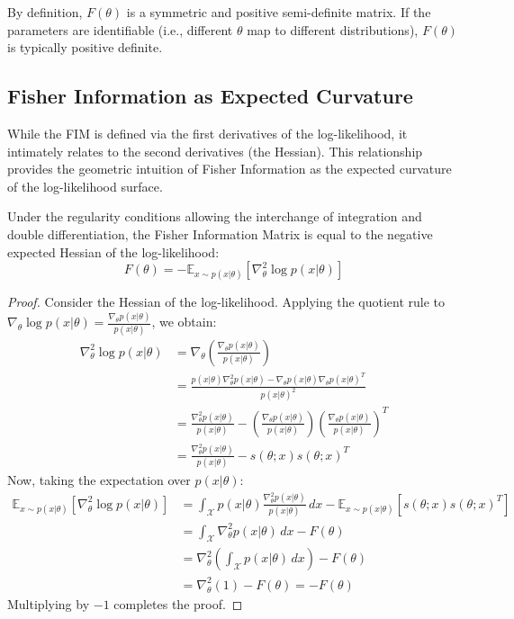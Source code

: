 By definition, $F(\theta)$ is a symmetric and positive semi-definite matrix. If the parameters are identifiable (i.e., different $\theta$ map to different distributions), $F(\theta)$ is typically positive definite.

\subsection{Fisher Information as Expected Curvature}

While the FIM is defined via the first derivatives of the log-likelihood, it intimately relates to the second derivatives (the Hessian). This relationship provides the geometric intuition of Fisher Information as the expected curvature of the log-likelihood surface.

\begin{theorem}
\label{thm:fim_hessian}
Under the regularity conditions allowing the interchange of integration and double differentiation, the Fisher Information Matrix is equal to the negative expected Hessian of the log-likelihood:
\begin{equation}
    F(\theta) = - \mathbb{E}_{x \sim p(x|\theta)}\left[ \nabla_\theta^2 \log p(x|\theta) \right]
\end{equation}
\end{theorem}
\begin{proof}
Consider the Hessian of the log-likelihood. Applying the quotient rule to $\nabla_\theta \log p(x|\theta) = \frac{\nabla_\theta p(x|\theta)}{p(x|\theta)}$, we obtain:
\begin{align*}
    \nabla_\theta^2 \log p(x|\theta) &= \nabla_\theta \left( \frac{\nabla_\theta p(x|\theta)}{p(x|\theta)} \right) \\
    &= \frac{p(x|\theta) \nabla_\theta^2 p(x|\theta) - \nabla_\theta p(x|\theta) \nabla_\theta p(x|\theta)^T}{p(x|\theta)^2} \\
    &= \frac{\nabla_\theta^2 p(x|\theta)}{p(x|\theta)} - \left( \frac{\nabla_\theta p(x|\theta)}{p(x|\theta)} \right) \left( \frac{\nabla_\theta p(x|\theta)}{p(x|\theta)} \right)^T \\
    &= \frac{\nabla_\theta^2 p(x|\theta)}{p(x|\theta)} - s(\theta; x) s(\theta; x)^T
\end{align*}
Now, taking the expectation over $p(x|\theta)$:
\begin{align*}
    \mathbb{E}_{x \sim p(x|\theta)}\left[ \nabla_\theta^2 \log p(x|\theta) \right] &= \int_{\mathcal{X}} p(x|\theta) \frac{\nabla_\theta^2 p(x|\theta)}{p(x|\theta)} \, dx - \mathbb{E}_{x \sim p(x|\theta)}\left[ s(\theta; x) s(\theta; x)^T \right] \\
    &= \int_{\mathcal{X}} \nabla_\theta^2 p(x|\theta) \, dx - F(\theta) \\
    &= \nabla_\theta^2 \left( \int_{\mathcal{X}} p(x|\theta) \, dx \right) - F(\theta) \\
    &= \nabla_\theta^2 (1) - F(\theta) = -F(\theta)
\end{align*}
Multiplying by $-1$ completes the proof.
\end{proof}

